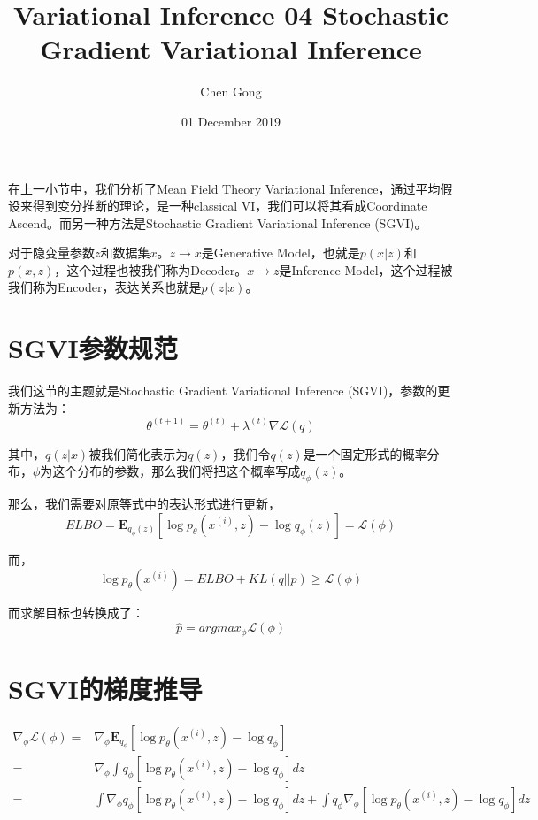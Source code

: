 \documentclass[a4paper]{article}
\title{Variational Inference 04 Stochastic Gradient Variational Inference}
\author{Chen Gong}
\date{01 December 2019}
\begin{document}
\maketitle
在上一小节中，我们分析了Mean Field Theory Variational Inference，通过平均假设来得到变分推断的理论，是一种classical VI，我们可以将其看成Coordinate Ascend。而另一种方法是Stochastic Gradient Variational Inference (SGVI)。

对于隐变量参数$z$和数据集$x$。$z \longrightarrow x$是Generative Model，也就是$p(x|z)$和$p(x,z)$，这个过程也被我们称为Decoder。$x \longrightarrow z$是Inference Model，这个过程被我们称为Encoder，表达关系也就是$p(z|x)$。

\section{SGVI参数规范}
我们这节的主题就是Stochastic Gradient Variational Inference (SGVI)，参数的更新方法为：
\begin{equation}
    \theta^{(t+1)} = \theta^{(t)} + \lambda^{(t)}\nabla \mathcal{L}(q)
\end{equation}

其中，$q(z|x)$被我们简化表示为$q(z)$，我们令$q(z)$是一个固定形式的概率分布，$\phi$为这个分布的参数，那么我们将把这个概率写成$q_{\phi}(z)$。

那么，我们需要对原等式中的表达形式进行更新，
\begin{equation}
    ELBO = \mathbf{E}_{q_{\phi}(z)}\left[ \log p_{\theta}(x^{(i)},z) - \log q_{\phi}(z) \right] = \mathcal{L}(\phi)
\end{equation}

而，
\begin{equation}
    \log p_{\theta}(x^{(i)}) = ELBO + KL(q||p) \geq \mathcal{L}(\phi)
\end{equation}

而求解目标也转换成了：
\begin{equation}
    \hat{p} = argmax_{\phi} \mathcal{L}(\phi)
\end{equation}

\section{SGVI的梯度推导}
\begin{equation}
    \begin{split}
        \nabla_{\phi} \mathcal{L}(\phi)
        = & \nabla_{\phi} \mathbf{E}_{q_{\phi}}\left[ \log p_{\theta}(x^{(i)},z) - \log q_{\phi} \right] \\
        = & \nabla_{\phi} \int q_{\phi}\left[ \log p_{\theta}(x^{(i)},z) - \log q_{\phi} \right]dz \\
         = &  \int \nabla_{\phi} q_{\phi}\left[ \log p_{\theta}(x^{(i)},z) - \log q_{\phi} \right]dz + 
         \int q_{\phi}\nabla_{\phi} \left[ \log p_{\theta}(x^{(i)},z) - \log q_{\phi} \right]dz \\
    \end{split}
\end{equation}
\end{document}
